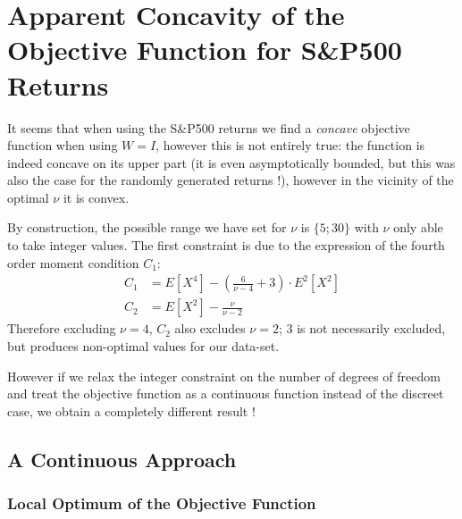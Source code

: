 \chapter{Apparent Concavity of the Objective Function for S\&P500 Returns}



It seems that when using the S\&P500 returns we find a \emph{concave} objective function when using $W=I$, however this is not entirely true: the function is indeed concave on its upper part (it is even asymptotically bounded, but this was also the case for the randomly generated returns !), however in the vicinity of the optimal $\nu$ it is convex. \smallskip
\par
By construction, the possible range we have set for $\nu$ is $\{5;30\}$ with $\nu$ only able to take integer values. The first constraint is due to the expression of the fourth order moment condition $C_1$:
\begin{align*}
    C_1 &= E\left[X^4\right] - \left(\frac{6}{\nu-4}+3\right)\cdot E^2\left[X^2\right] \\
    C_2 &= E\left[X^2\right] - \frac{\nu}{\nu - 2}
\end{align*}
Therefore excluding $\nu = 4$, $C_2$ also excludes $\nu=2$; $3$ is not necessarily excluded, but produces non-optimal values for our data-set.
\smallskip\par
However if we relax the integer constraint on the number of degrees of freedom and treat the objective function as a continuous function instead of the discreet case, we obtain a completely different result !


\section{A Continuous Approach}

\subsection{Local Optimum of the Objective Function}

